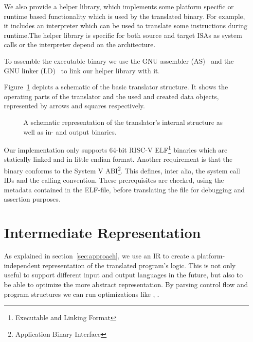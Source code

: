 \documentclass[course=eragp]{aspdoc}
\begin{document}
\par

We also provide a helper library, which implements some platform specific or runtime based
functionality which is used by the translated binary. For example, it includes an interpreter which
can be used to translate some instructions during runtime.The helper library is specific for both
source and target ISAs as system calls or the interpreter depend on the architecture.

\par

To assemble the executable binary we use the GNU assembler (AS)~\cite{gnu_binutils} and the GNU
linker (LD)~\cite{gnu_binutils} to link our helper library with it.

\par

Figure~\ref{fig:program_overview} depicts a schematic of the basic translator structure. It shows the
operating parts of the translator and the used and created data objects, represented by arrows and
squares respectively.

\begin{figure}[H]
    \centering
    \caption{A schematic representation of the translator's internal structure as well as in- and
        output binaries.}\label{fig:program_overview}
\end{figure}

\par

Our implementation only supports 64-bit RISC-V ELF\footnote{Executable and Linking Format} binaries
which are statically linked and in little endian format. Another requirement is that the binary
conforms to the System V ABI\footnote{Application Binary Interface}. This defines, inter alia, the
system call IDs and the calling convention. These prerequisites are checked, using the metadata
contained in the ELF-file, before translating the file for debugging and assertion purposes.

\section{Intermediate Representation}\label{sec:ir}

As explained in section~\ref{sec:approach}, we use an IR to create a platform-independent
representation of the translated program's logic. This is not only useful to support different input
and output languages in the future, but also to be able to optimize the more abstract representation.
By parsing control flow and program structures we can run optimizations like
, .
\end{document}
